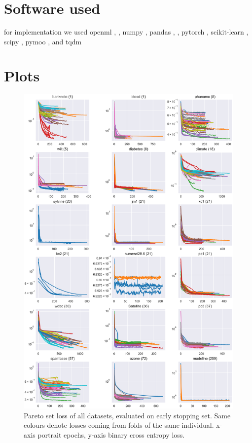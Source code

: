 \documentclass[twoside,11pt]{article}
\begin{document}



\vskip 0.2in



\appendix
\section{Software used}
for implementation we used
openml \cite{OpenML}, \cite{OpenMLPython},
numpy \cite{numpy},
pandas \cite{pandas1}, \cite{pandas2},
pytorch \cite{PyTorch},
scikit-learn \cite{scikit-learn},
scipy \cite{SciPy},
pymoo \cite{pymoo}, and
tqdm \cite{tqdm}

\section{Plots}
\begin{figure}
  \centering
  \includegraphics[width=0.9\linewidth]{../code/export/plot_early_stopping_losses_pareto_set.png}
  \caption{Pareto set loss of all datasets, evaluated on early stopping set. Same colours denote losses coming from folds of the same individual.
            x-axis portrait epochs, y-axis binary cross entropy loss.}
  \label{fig-es-losses}
\end{figure}
\end{document}

